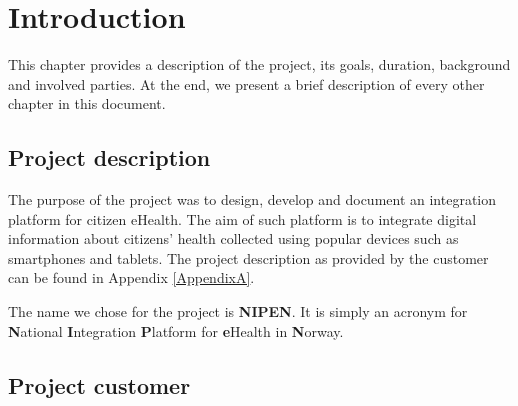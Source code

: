 
\chapter{Introduction} 
\label{Introduction} 


This chapter provides a description of the project, its goals, duration, background and involved parties.
At the end, we present a brief description of every other chapter in this document.

\section{Project description}
\label{section:description}

The purpose of the project was to design, develop and document an integration platform for citizen eHealth\cite{ehealth}. 
The aim of such platform is to integrate digital information about citizens' health \iffalse which is\fi collected using popular
devices such as smartphones and tablets.
The project description as provided by the customer can be found in Appendix \ref{AppendixA}.



The name we chose for the project is \textbf{NIPEN}.\newline
It is simply an acronym for \textbf{N}ational \textbf{I}ntegration \textbf{P}latform for \textbf{e}Health
in \textbf{N}orway.

\section{Project customer}
\label{section:client}

